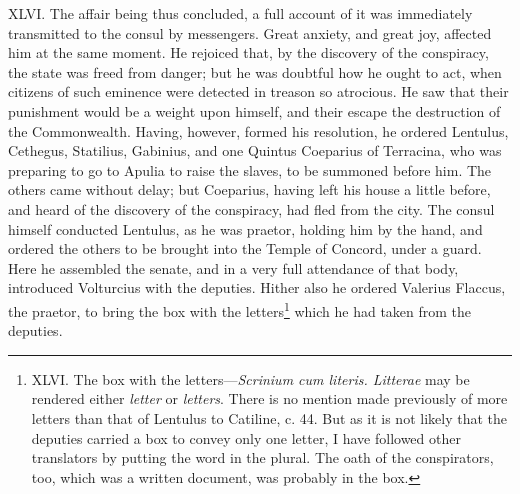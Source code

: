 XLVI. The affair being thus concluded, a full account of it was
immediately transmitted to the consul by messengers. Great anxiety,
and great joy, affected him at the same moment. He rejoiced that, by
the discovery of the conspiracy, the state was freed from danger; but
he was doubtful how he ought to act, when citizens of such eminence
were detected in treason so atrocious. He saw that their punishment
would be a weight upon himself, and their escape the destruction of
the Commonwealth. Having, however, formed his resolution, he ordered
Lentulus, Cethegus, Statilius, Gabinius, and one Quintus Coeparius of
Terracina, who was preparing to go to Apulia to raise the slaves, to
be summoned before him. The others came without delay; but Coeparius,
having left his house a little before, and heard of the discovery of
the conspiracy, had fled from the city. The consul himself conducted
Lentulus, as he was praetor, holding him by the hand, and ordered the
others to be brought into the Temple of Concord, under a guard. Here
he assembled the senate, and in a very full attendance of that body,
introduced Volturcius with the deputies. Hither also he ordered
Valerius Flaccus, the praetor, to bring the box with the letters\footnote{XLVI. The box with the letters—\emph{Scrinium cum literis. Litterae}
may be rendered either \emph{letter} or \emph{letters}. There is no mention made
previously of more letters than that of Lentulus to Catiline, c. 44.
But as it is not likely that the deputies carried a box to convey only
one letter, I have followed other translators by putting the word in
the plural. The oath of the conspirators, too, which was a written
document, was probably in the box.}
which he had taken from the deputies.

